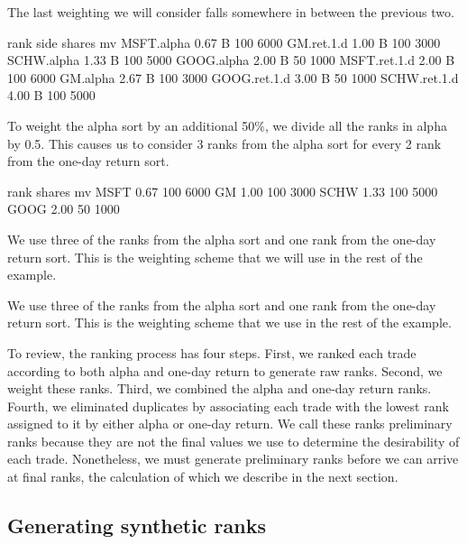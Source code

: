 \documentclass{article}
\begin{document}
The last weighting we will consider falls somewhere in between the
previous two.  

\begin{Schunk}
\begin{Soutput}
             rank side shares   mv
MSFT.alpha   0.67    B    100 6000
GM.ret.1.d   1.00    B    100 3000
SCHW.alpha   1.33    B    100 5000
GOOG.alpha   2.00    B     50 1000
MSFT.ret.1.d 2.00    B    100 6000
GM.alpha     2.67    B    100 3000
GOOG.ret.1.d 3.00    B     50 1000
SCHW.ret.1.d 4.00    B    100 5000
\end{Soutput}
\end{Schunk}

To weight the alpha sort by an additional 50\%, we divide all the
ranks in alpha by 0.5.  This causes us to consider 3 ranks from the
alpha sort for every 2 rank from the one-day return sort.

\begin{Schunk}
\begin{Soutput}
     rank shares   mv
MSFT 0.67    100 6000
GM   1.00    100 3000
SCHW 1.33    100 5000
GOOG 2.00     50 1000
\end{Soutput}
\end{Schunk}

We use three of the ranks from the alpha sort and one
rank from the one-day return sort.  This is the weighting scheme that
we will use in the rest of the example.

We use three of the ranks from the alpha sort and one
rank from the one-day return sort.  This is the weighting scheme that
we use in the rest of the example.

To review, the ranking process has four steps.  First, we ranked each
trade according to both alpha and one-day return to generate raw
ranks.  Second, we weight these ranks.  Third, we combined the alpha
and one-day return ranks.  Fourth, we eliminated duplicates by
associating each trade with the lowest rank assigned to it by either
alpha or one-day return.  We call these ranks preliminary ranks
because they are not the final values we use to determine the
desirability of each trade.  Nonetheless, we must generate preliminary
ranks before we can arrive at final ranks, the calculation of which we
describe in the next section.

\subsection{Generating synthetic ranks}
\label{generating synthetic ranks}
\end{document}
